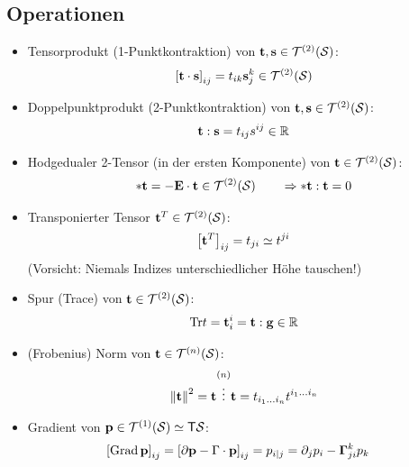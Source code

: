 \documentclass[a4paper,11pt]{scrartcl}
\newcommand{\tspace}{\mathcal{T}^{(2)}(\surf)}
\newcommand{\Tr}{\text{Tr}}
\begin{document}
\subsection{Operationen}
\begin{itemize}
  \item Tensorprodukt (1-Punktkontraktion) von \( \mathbf{t},\mathbf{s}\in\mathcal{T}^{(2)}(\mathcal{S}) \):
        \begin{align}
          \left[\tb \cdot \sb\right]_{ij} = t_{ik}\tensor{s}{^{k}_{j}}\in\tspace
        \end{align}
  \item Doppelpunktprodukt (2-Punktkontraktion) von \( \mathbf{t},\mathbf{s}\in\mathcal{T}^{(2)}(\mathcal{S}) \):
        \begin{align}
          \mathbf{t} : \mathbf{s} = t_{ij}s^{ij}\in\mathbb{R}
        \end{align}
  \item Hodgedualer 2-Tensor (in der ersten Komponente) von \( \tb\in\tspace \):
        \begin{align}
          *\tb = -\Eb\cdot\tb \in \tspace \qquad \Rightarrow *\tb:\tb = 0
        \end{align}
  \item Transponierter Tensor \( \mathbf{t}^{T}\in\mathcal{T}^{(2)}(\mathcal{S}) \): 
       \begin{align}
         \left[ \mathbf{t}^{T} \right]_{ij} = t_{ji} \simeq t^{ji}
       \end{align}
       (Vorsicht: Niemals Indizes unterschiedlicher Höhe tauschen!)
  \item Spur (Trace) von \( \mathbf{t}\in\mathcal{T}^{(2)}(\mathcal{S}) \):
    \begin{align}
      \Tr t = \tensor{t}{_{i}^{i}} = \tb:\gb \in \R
    \end{align}
  \item (Frobenius) Norm von  \( \mathbf{t}\in\mathcal{T}^{(n)}(\mathcal{S}) \):
    \begin{align}
      \left\| \mathbf{t} \right\|^{2} = \mathbf{t} \overset{(n)}{\vdots} \mathbf{t}
                              = t_{i_{1}\ldots i_{n}} t^{i_{1}\ldots i_{n}}
    \end{align}
  \item Gradient von \( \mathbf{p} \in \mathcal{T}^{(1)}(\mathcal{S}) \simeq \mathsf{T}\mathcal{S} \):
      \begin{align}
        \left[ \operatorname{Grad}\mathbf{p} \right]_{ij} &= \left[ \partial\mathbf{p} - \Gamma\cdot\mathbf{p} \right]_{ij}
                  = p_{i|j}
                  = \partial_{j}p_{i} - \mathbf{\Gamma}{_{ji}^{k}}p_{k}
      \end{align}

\end{itemize}
\end{document}
